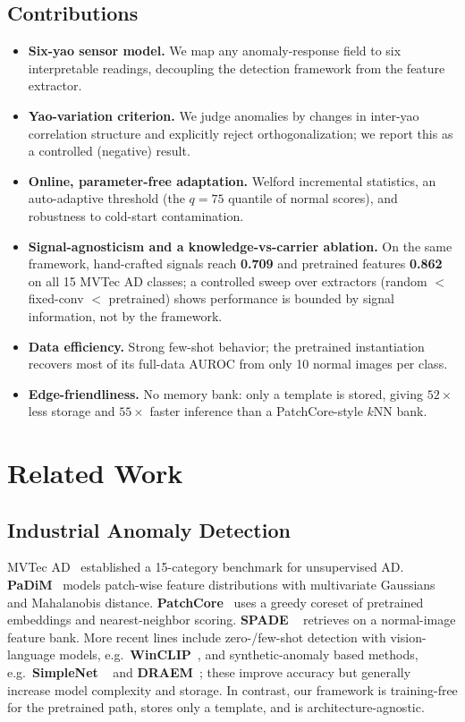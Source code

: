 \documentclass[preprint,12pt]{elsarticle}
\begin{document}
\subsection{Contributions}
\begin{itemize}
\item \textbf{Six-yao sensor model.} We map any anomaly-response field to
six interpretable readings, decoupling the detection framework from the
feature extractor.
\item \textbf{Yao-variation criterion.} We judge anomalies by changes in
inter-yao correlation structure and explicitly reject orthogonalization;
we report this as a controlled (negative) result.
\item \textbf{Online, parameter-free adaptation.} Welford incremental
statistics, an auto-adaptive threshold (the $q{=}75$ quantile of normal
scores), and robustness to cold-start contamination.
\item \textbf{Signal-agnosticism and a knowledge-vs-carrier ablation.}
On the same framework, hand-crafted signals reach \textbf{0.709} and
pretrained features \textbf{0.862} on all 15 MVTec AD classes; a controlled
sweep over extractors (random $<$ fixed-conv $<$ pretrained) shows
performance is bounded by signal information, not by the framework.
\item \textbf{Data efficiency.} Strong few-shot behavior; the pretrained
instantiation recovers most of its full-data AUROC from only 10 normal
images per class.
\item \textbf{Edge-friendliness.} No memory bank: only a template is
stored, giving \textbf{$52\times$} less storage and \textbf{$55\times$} faster
inference than a PatchCore-style $k$NN bank.
\end{itemize}

\section{Related Work}
\subsection{Industrial Anomaly Detection}
MVTec AD~\cite{bergmann2019mvtec} established a 15-category benchmark for
unsupervised AD. \textbf{PaDiM}~\cite{defard2021padim} models patch-wise
feature distributions with multivariate Gaussians and Mahalanobis
distance. \textbf{PatchCore}~\cite{roth2022patchcore} uses a greedy coreset
of pretrained embeddings and nearest-neighbor scoring. \textbf{SPADE}
~\cite{cohen2021spade} retrieves on a normal-image feature bank.
More recent lines include zero-/few-shot detection with vision-language
models, e.g.\ \textbf{WinCLIP}~\cite{jeong2023winclip}, and
synthetic-anomaly based methods, e.g.\ \textbf{SimpleNet}
~\cite{liu2023simplenet} and \textbf{DRAEM}~\cite{zavrtanik2021draem};
these improve accuracy but generally increase model complexity and
storage. In contrast, our framework is training-free for the pretrained
path, stores only a template, and is architecture-agnostic.
\end{document}
